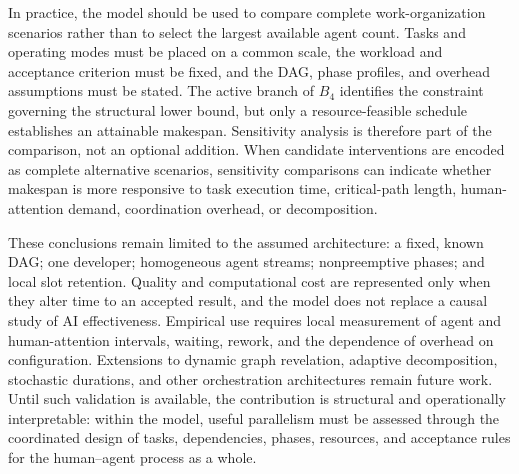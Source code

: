 In practice, the model should be used to compare complete work-organization
scenarios rather than to select the largest available agent count. Tasks and
operating modes must be placed on a common scale, the workload and acceptance
criterion must be fixed, and the DAG, phase profiles, and overhead assumptions
must be stated. The active branch of $B_4$ identifies the constraint governing
the structural lower bound, but only a resource-feasible schedule establishes
an attainable makespan. Sensitivity analysis is therefore part of the
comparison, not an optional addition. When candidate interventions are encoded
as complete alternative scenarios, sensitivity comparisons can indicate
whether makespan is more responsive to task execution time, critical-path
length, human-attention demand, coordination overhead, or decomposition.

These conclusions remain limited to the assumed architecture: a fixed, known
DAG; one developer; homogeneous agent streams; nonpreemptive phases; and local
slot retention. Quality and computational cost are represented only when they
alter time to an accepted result, and the model does not replace a causal study
of AI effectiveness. Empirical use requires local measurement of agent and
human-attention intervals, waiting, rework, and the dependence of overhead on
configuration. Extensions to dynamic graph revelation, adaptive decomposition,
stochastic durations, and other orchestration architectures remain future
work. Until such validation is available, the contribution is structural and
operationally interpretable: within the model, useful parallelism must be
assessed through the coordinated design of tasks, dependencies, phases,
resources, and acceptance rules for the human--agent process as a whole.
